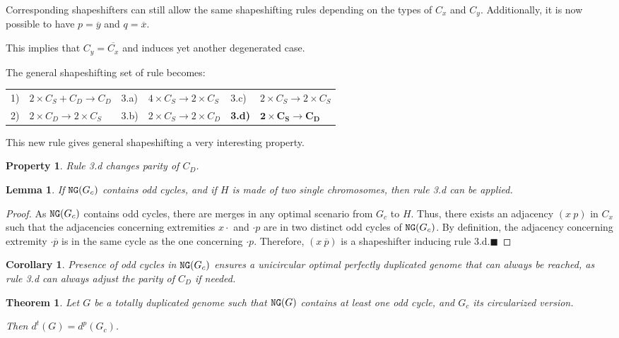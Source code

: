 \documentclass[11pt,final,twoside,nofrench]{thlifl}
\newcommand{\qed}{\ensuremath{\blacksquare}}
\newcommand{\fst}[1]{ \ensuremath{#1} }
\newcommand{\snd}[1]{ \ensuremath{\overline{#1}} }
\newcommand\aff[2]{\ensuremath{(\fst{#1}~\fst{#2})}}
\newcommand\afs[2]{\ensuremath{(\fst{#1}~\snd{#2})}}
\renewcommand{\NG}{\ensuremath{\mbox{\texttt{NG}}}}
\newtheorem{property}{Property}
\newtheorem{proof}{Proof}
\newtheorem{theorem}{Theorem}
\newtheorem{lemma}{Lemma}
\newtheorem{corollary}{Corollary}
\begin{document}
Corresponding shapeshifters can still allow the same shapeshifting rules depending on the types of $C_x$ and $C_y$. Additionally, it is now possible to have $p = \snd{y}$ and $q = \snd{x}$.

This implies that $C_y = \snd{C_x}$ and induces yet another
degenerated case.

The general shapeshifting set of rule becomes: 
\begin{center}
    \begin{tabular}{ll@{$\quad$}ll@{$\quad$}ll}
        1) & {$2\times C_S + C_D \rightarrow C_D$}   & 3.a) & {$4\times C_S
          \rightarrow 2\times C_S$} & 3.c) & {$2\times C_S \rightarrow 2\times C_S$} \\
        2) & {$2\times C_D \rightarrow 2\times C_S$} & 3.b) & {$2\times C_S
          \rightarrow 2\times C_D$} & \textbf{3.d)} & {$\mathbf{2\times C_S \rightarrow C_D}$} \\
    \end{tabular}
\end{center}
This new rule gives general shapeshifting a very interesting property.

\begin{property}
Rule 3.d changes parity of $C_D$.
\end{property}

\begin{lemma}
\label{lem:parity}
If $\NG(G_c)$ contains odd cycles, and if $H$ is made of two single chromosomes, then rule 3.d can be applied.
\end{lemma}
\begin{proof}
As $\NG(G_c)$ contains odd cycles, there are merges in any optimal scenario from $G_c$ to $H$. Thus, there exists an adjacency \aff{x}{p} in $C_x$ such that the adjacencies concerning extremities $x\cdot$ and $\cdot p$ are in two distinct odd cycles of $\NG(G_c)$. By definition, the adjacency concerning extremity $\cdot \snd{p}$ is in the same cycle as the one concerning $\cdot p$.
Therefore, \afs{x}{p} is a shapeshifter inducing rule 3.d.\qed
\end{proof}
\begin{corollary}
Presence of odd cycles in $\NG(G_c)$ ensures a unicircular optimal
perfectly duplicated genome that can always be reached, as rule 3.d can always adjust the parity of $C_D$ if needed. \end{corollary}

\begin{theorem}
\label{th:generalized}
Let $G$ be a totally duplicated genome such that $\NG(G)$ contains at least one odd cycle, and $G_c$ its circularized version.

Then $d^t(G) = d^p(G_c)$.
\end{theorem}
\end{document}
